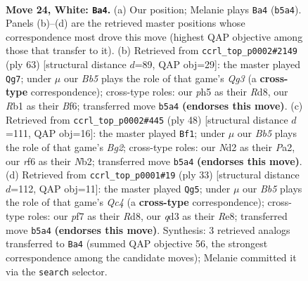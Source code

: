 \documentclass[11pt]{article}
\begin{document}
\clearpage

\begin{figure}[p]\centering
\begin{subfigure}{0.46\textwidth}\centering
\resizebox{\linewidth}{!}{%
\newchessgame
\chessboard[
  setfen={5r2/1b3pk1/2p2rp1/pB2Q2p/2P4P/3q4/PP1N2P1/1RB3K1 w - - 0 24},
  showmover=false,
  pgfstyle=straightmove, color=movearrow, markmove={b5-a4}
]}
\caption{}
\end{subfigure}\hfill
\begin{subfigure}{0.46\textwidth}\centering
\resizebox{\linewidth}{!}{%
\newchessgame
\chessboard[
  setfen={2br4/2p4k/p1Q2bqp/3n4/1p6/3P4/PPP3PP/1K2RRB1 b - - 0 32},
  showmover=false,
  pgfstyle=straightmove, color=movearrow, markmove={g6-g7}
]}
\caption{}
\end{subfigure}
\\[4pt]
\begin{subfigure}{0.46\textwidth}\centering
\resizebox{\linewidth}{!}{%
\newchessgame
\chessboard[
  setfen={4k2r/p2r1p2/2p2q2/2P5/2P3p1/4PpQ1/PN4B1/R1B3K1 w k - 2 25},
  showmover=false,
  pgfstyle=straightmove, color=movearrow, markmove={g2-f1}
]}
\caption{}
\end{subfigure}\hfill
\begin{subfigure}{0.46\textwidth}\centering
\resizebox{\linewidth}{!}{%
\newchessgame
\chessboard[
  setfen={3rr1k1/ppp2p1p/2b2p2/2q5/5Q2/4PP2/PP2BKPP/R1R5 b - - 1 17},
  showmover=false,
  pgfstyle=straightmove, color=movearrow, markmove={c5-g5}
]}
\caption{}
\end{subfigure}
\caption{\textbf{Move 24, White: \texttt{Ba4}.} (a) Our position; Melanie plays \texttt{Ba4} (\texttt{b5a4}). Panels (b)--(d) are the retrieved master positions whose correspondence most drove this move (highest QAP objective among those that transfer to it). (b) Retrieved from \texttt{ccrl\_top\_p0002\#2149} (ply 63) [structural distance $d$=89, QAP obj=29]: the master played \texttt{Qg7}; under $\mu$ our \emph{Bb5} plays the role of that game's \emph{Qg3} (a \textbf{cross-type} correspondence); cross-type roles: our \emph{p}h5 as their \emph{R}d8, our \emph{R}b1 as their \emph{B}f6; transferred move \texttt{b5a4} \textbf{(endorses this move)}. (c) Retrieved from \texttt{ccrl\_top\_p0002\#445} (ply 48) [structural distance $d$=111, QAP obj=16]: the master played \texttt{Bf1}; under $\mu$ our \emph{Bb5} plays the role of that game's \emph{Bg2}; cross-type roles: our \emph{N}d2 as their \emph{P}a2, our \emph{r}f6 as their \emph{N}b2; transferred move \texttt{b5a4} \textbf{(endorses this move)}. (d) Retrieved from \texttt{ccrl\_top\_p0001\#19} (ply 33) [structural distance $d$=112, QAP obj=11]: the master played \texttt{Qg5}; under $\mu$ our \emph{Bb5} plays the role of that game's \emph{Qc4} (a \textbf{cross-type} correspondence); cross-type roles: our \emph{p}f7 as their \emph{R}d8, our \emph{q}d3 as their \emph{R}e8; transferred move \texttt{b5a4} \textbf{(endorses this move)}. Synthesis: 3 retrieved analogs transferred to \texttt{Ba4} (summed QAP objective 56, the strongest correspondence among the candidate moves); Melanie committed it via the \texttt{search} selector.}
\label{fig:thought-m46}
\end{figure}
\end{document}
